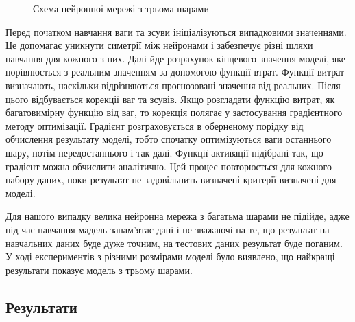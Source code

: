 \begin{figure}[H]
\begin{center}
{
            }
            \caption{Схема нейронної мережі з трьома шарами}
    \end{center}
\end{figure}

Перед початком навчання ваги та зсуви ініціалізуються випадковими значеннями. 
Це допомагає уникнути симетрії між нейронами і забезпечує різні шляхи навчання для кожного з них. 
Далі йде розрахунок кінцевого значення моделі, яке порівнюється з реальним значенням за допомогою функції втрат. 
Функції витрат визначають, наскільки відрізняються прогнозовані значення від реальних. 
Після цього відбувається корекції ваг та зсувів. 
Якщо розгладати функцію витрат, як багатовимірну функцію від ваг, то корекція полягає у застосування градієнтного методу оптимізації. 
Градієнт розграховується в оберненому порідку від обчислення результату моделі, тобто спочатку оптимізуються ваги останнього шару, потім передостаннього і так далі. 
Функції активації підібрані так, що градієнт можна обчислити аналітично. 
Цей процес повторюється для кожного набору даних, поки результат не задовільнить визначені критерії визначені для моделі. 

Для нашого випадку велика нейронна мережа з багатьма шарами не підійде, адже під час навчання мадель запам'ятає дані і не зважаючі на те, що результат на навчальних даних буде дуже точним, на тестових даних результат буде поганим. 
У ході експериментів з різними розмірами моделі було виявлено, що найкращі результати показує модель з трьому шарами. 




\subsection{Результати}
